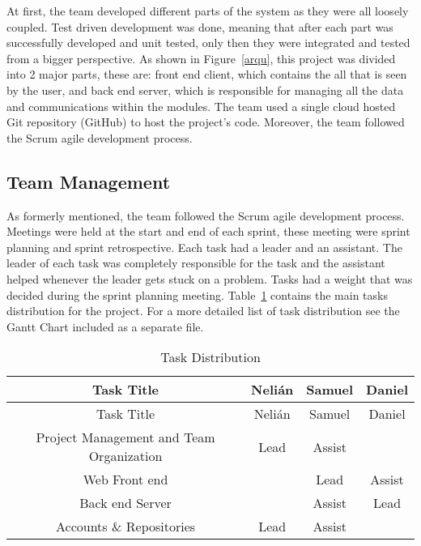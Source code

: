
At first, the team developed different parts of
the system as they were all loosely coupled. Test driven development was
done, meaning that after each part was successfully developed and unit tested,
only then they were integrated and tested from a bigger perspective. As shown in Figure~\ref{arqu}, this project
was divided into 2 major parts, these are: front end client, which contains the all that is seen by the user, and back end server, which is responsible for managing all the data and communications within the modules. The team used a single cloud hosted Git repository (GitHub) to host the project's
code. Moreover, the
team followed the Scrum agile development process.


\subsection{Team Management}

As formerly mentioned, the team followed the Scrum agile development process.
Meetings were held at the start and end of each sprint, these meeting were
sprint planning and sprint retrospective. Each task had a leader and an
assistant. The leader of each task was completely responsible for the task and
the assistant helped whenever the leader gets stuck on a problem. Tasks had a weight that was decided during the sprint planning
meeting. Table~\ref{tasks} contains the main tasks distribution for the project.
For a more detailed list of task distribution see the Gantt Chart included as a
separate file.

\setlength{\extrarowheight}{1.5pt}
  \begin{longtable}{|c|c|c|c|}
 \caption{Task Distribution \label{tasks}} \\
   \hline
  
  \centering Task Title & Nelián & Samuel & Daniel \\
  \hline \hline \endfirsthead
  
     \hline

	\centering Task Title & Nelián & Samuel & Daniel \\  
	\hline \hline \endhead
  
  \endfoot  
  
  Project Management and Team Organization & Lead & Assist & \\ \hline
  Web Front end & & Lead & Assist \\ \hline
  Back end Server & & Assist & Lead \\ \hline
  Accounts \& Repositories & Lead & Assist &\\ \hline
   \end{longtable}
